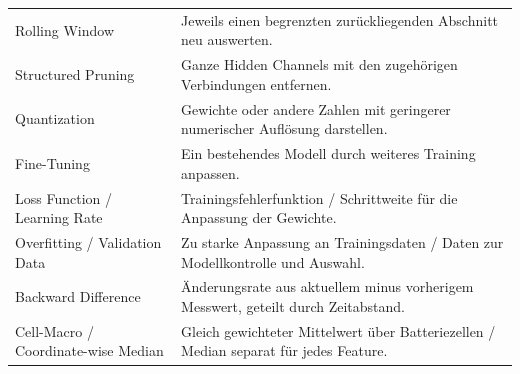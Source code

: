 \documentclass[11pt,a4paper]{article}
\begin{document}
{\begin{longtable}{>{\raggedright\arraybackslash}p{51mm}>{\raggedright\arraybackslash}p{109mm}}
Rolling Window & Jeweils einen begrenzten zurückliegenden Abschnitt neu auswerten. \\[4pt]
Structured Pruning & Ganze Hidden Channels mit den zugehörigen Verbindungen entfernen. \\[4pt]
Quantization & Gewichte oder andere Zahlen mit geringerer numerischer Auflösung darstellen. \\[4pt]
Fine-Tuning & Ein bestehendes Modell durch weiteres Training anpassen. \\[4pt]
Loss Function /\allowbreak{} Learning Rate & Trainingsfehlerfunktion /\allowbreak{} Schrittweite für die Anpassung der Gewichte. \\[4pt]
Overfitting /\allowbreak{} Validation Data & Zu starke Anpassung an Trainingsdaten /\allowbreak{} Daten zur Modellkontrolle und Auswahl. \\[4pt]
Backward Difference & Änderungsrate aus aktuellem minus vorherigem Messwert, geteilt durch Zeitabstand. \\[4pt]
Cell-Macro /\allowbreak{} Coordinate-wise Median & Gleich gewichteter Mittelwert über Batteriezellen /\allowbreak{} Median separat für jedes Feature. \\[4pt]
\bottomrule\end{longtable}}
\end{document}
